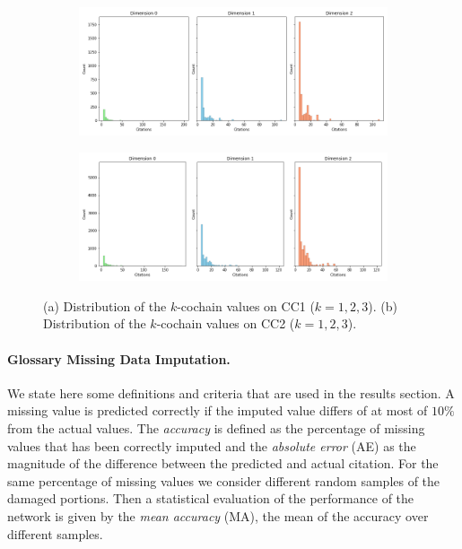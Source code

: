 \begin{figure}[tb]
\centering
 \begin{subfigure}[t]{-0.8\textwidth}
 \vspace{-4cm}
  \end{subfigure}
\begin{subfigure}[t]{0.8\textwidth}
\centering
   \includegraphics[scale=0.26]{./figures/distribution_cochain_150250.png}
\end{subfigure}
 \begin{subfigure}[t]{0.8\textwidth}
  \end{subfigure}
\begin{subfigure}[t]{0.8\textwidth}
\centering
\vspace{-0.5cm}
   \includegraphics[scale=0.26]{./figures/distribution_cochain_11779.png}
\end{subfigure}
\caption{(a) Distribution of the $k$-cochain values on CC1 ($k=1,2,3$). (b) Distribution of the $k$-cochain values on CC2 ($k=1,2,3$).}
\label{fig:dist-cochains}
\end{figure}

\paragraph{Glossary Missing Data Imputation.}
We state here some definitions and criteria that are used in the results section.
A missing value is predicted correctly if the imputed value differs of at most of $10\%$ from the actual values. The \emph{accuracy} is defined as the percentage of missing values that has been correctly imputed and the \emph{absolute error} (AE) as the magnitude of the difference between the predicted and actual citation.
For the same percentage of missing values we consider different random samples of the damaged portions. Then a statistical evaluation of the performance of the network is given by the \emph{mean accuracy} (MA), the mean of the accuracy over different samples.
